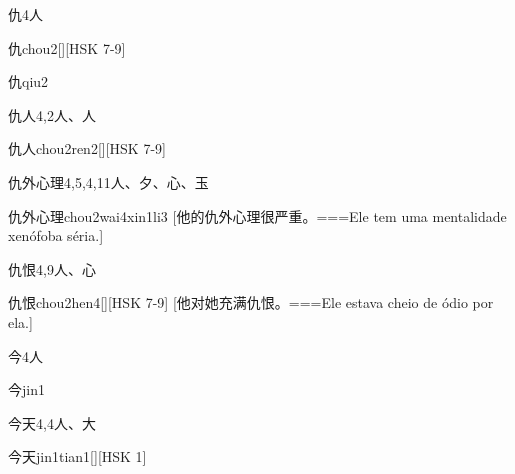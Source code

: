 \begin{Entry}{仇}{4}{⼈}
  \begin{Phonetics}{仇}{chou2}[][HSK 7-9]
  \end{Phonetics}
  \begin{Phonetics}{仇}{qiu2}
  \end{Phonetics}
\end{Entry}

\begin{Entry}{仇人}{4,2}{⼈、⼈}
  \begin{Phonetics}{仇人}{chou2ren2}[][HSK 7-9]
  \end{Phonetics}
\end{Entry}

\begin{Entry}{仇外心理}{4,5,4,11}{⼈、⼣、⼼、⽟}
  \begin{Phonetics}{仇外心理}{chou2wai4xin1li3}
    [他的仇外心理很严重。===Ele tem uma mentalidade xenófoba séria.]
  \end{Phonetics}
\end{Entry}

\begin{Entry}{仇恨}{4,9}{⼈、⼼}
  \begin{Phonetics}{仇恨}{chou2hen4}[][HSK 7-9]
    [他对她充满仇恨。===Ele estava cheio de ódio por ela.]
  \end{Phonetics}
\end{Entry}

\begin{Entry}{今}{4}{⼈}
  \begin{Phonetics}{今}{jin1}
  \end{Phonetics}
\end{Entry}

\begin{Entry}{今天}{4,4}{⼈、⼤}
  \begin{Phonetics}{今天}{jin1tian1}[][HSK 1]
  \end{Phonetics}
\end{Entry}


